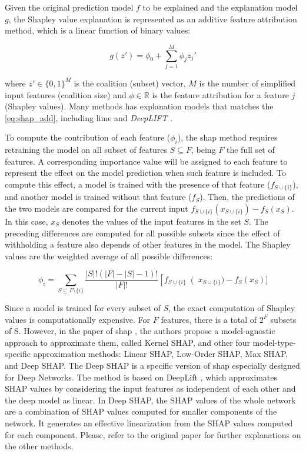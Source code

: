 Given the original prediction model $f$ to be explained and the explanation model $g$, the Shapley value explanation is represented as an additive feature attribution method, which is a linear function of binary values:

\begin{equation}
\label{eq:shap_add}
g(z')=\phi_0+\sum_{j=1}^M\phi_jz_j'
\end{equation}

\noindent
where $z' \in \{0,1\}^M$ is the coalition (subset) vector, $M$ is the number of simplified input features (coalition size) and $\phi \in \mathbb{R}$ is the feature attribution for a feature $j$ (Shapley values). Many methods has explanation models that matches the \autoref{eq:shap_add}, including \acs{lime} \citep{lime} and \textit{DeepLIFT} \citep{deeplift_old, deeplift_new}.

To compute the contribution of each feature ($\phi_i$), the \acs{shap} method requires retraining the model on all subset of features $S \subseteq F$, being $F$ the full set of features. A corresponding importance value will be assigned to each feature to represent the effect on the model prediction when such feature is included. To compute this effect, a model is trained with the presence of that feature ($f_{S \cup \{i\}}$), and another model is trained without that feature ($f_S$). Then, the predictions of the two models are compared for the current input $f_{S \cup \{i\}}(x_{S \cup \{i\}}) - f_S(x_S)$. In this case, $x_S$ denotes the values of the input features in the set $S$. The preceding differences are computed for all possible subsets since the effect of withholding a feature also depends of other features in the model. The Shapley values are the weighted average of all possible differences:

\begin{equation}
\phi_i = \sum_{S \subseteq F \setminus \{i\}} \frac{\left|S\right|!(\left|F\right| - \left|S\right| - 1)!}{\left|F\right|!}\left[f_{S \cup \{i\}}\right (x_{S \cup \{i\}}) - f_S(x_S)]
\end{equation}

Since a model is trained for every subset of $S$, the exact computation of Shapley values is computationally expensive. For $F$ features, there is a total of $2^F$ subsets of S. However, in the paper of \acs{shap} \citep{shap2018}, the authors propose a model-agnostic approach to approximate them, called Kernel SHAP, and other four model-type-specific approximation methods: Linear SHAP, Low-Order SHAP, Max SHAP, and Deep SHAP. The Deep SHAP is a specific version of \acs{shap} especially designed for Deep Networks. The method is based on DeepLift \citep{deeplift_old, deeplift_new}, which approximates SHAP values by considering the input features as independent of each other and the deep model as linear. In Deep SHAP, the SHAP values of the whole network are a combination of SHAP values computed for smaller components of the network. It generates an effective linearization from the SHAP values computed for each component. Please, refer to the original paper for further explanations on the other methods.

